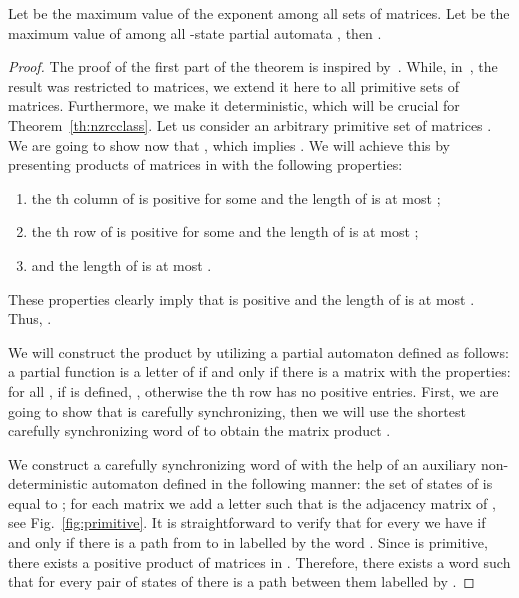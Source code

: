 \documentclass[a4paper,USenglish]{lipics}
\theoremstyle{definition}
\begin{document}
\begin{theorem}
\label{th:expcar}
Let  be the maximum value of the exponent among all sets of  matrices. Let  be the maximum value of  among all -state partial automata , then .
\end{theorem}
\begin{proof}
The proof of the first part of the theorem is inspired by~\cite[Theorem 16]{BJO15}. 
While, in~\cite{BJO15}, the result was restricted to  matrices, we extend it here to all primitive sets of matrices.  
Furthermore, we make it deterministic, which will be crucial for Theorem~\ref{th:nzrcclass}.
Let us consider an arbitrary primitive set of matrices . We are going to show now that , which implies . 
We will achieve this by presenting products  of matrices in  with the following properties: 
\begin{enumerate}
\item the th column of  is positive for some  and the length of  is at most ;
\item the th row of  is positive for some  and the length of  is at most ;
\item  and the length of  is at most .
\end{enumerate}
These properties clearly imply that  is positive and the length of  is at most . Thus, .


We will construct the product  by utilizing a partial automaton  defined as follows: a partial function  is a letter of  if and only if there is a matrix  with the properties: for all , if  is defined, , otherwise the th row has no positive entries. First, we are going to show that  is carefully synchronizing, then we will use the shortest carefully synchronizing word of  to obtain the matrix product .

We construct a carefully synchronizing word of  with the help of an auxiliary non-deterministic automaton  defined in the following manner:  the set of states of  is equal to ; for each matrix  we add a letter  such that  is the adjacency matrix of , see Fig.~\ref{fig:primitive}. It is straightforward to verify that for every  we have  if and only if there is a path from  to  in  labelled by the word . Since  is primitive, there exists a positive product of matrices in . Therefore, there exists a word  such that for every pair of states of  there is a path between them labelled by . 


\end{proof}
\end{document}
